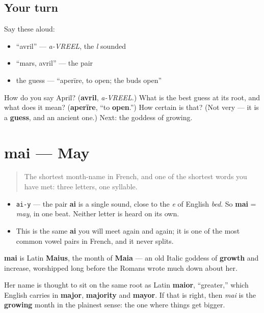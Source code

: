 \subsection*{Your turn}
Say these aloud:

\begin{itemize}
\raggedright
  \item \textquotedblleft{}avril\textquotedblright{} — \emph{a-VREEL}, the \emph{l} sounded
  \item \textquotedblleft{}mars, avril\textquotedblright{} — the pair
  \item the guess — \textquotedblleft{}aperīre, to open; the buds open\textquotedblright{}
\end{itemize}

\begin{tcolorbox}[breakable,colback=teal!4,colframe=teal!35!black,title={Before you move on}]
How do you say April? (\textbf{avril}, \emph{a-VREEL}.) What is the best guess at its root, and what does it mean? (\textbf{aperīre}, \textquotedblleft{}to \textbf{open}.\textquotedblright{}) How certain is that? (Not very — it is a \textbf{guess}, and an ancient one.) Next: the goddess of growing.
\end{tcolorbox}
\section[mai]{mai — May}

\label{lesson:FR-C09-mai}



\begin{quote}
The shortest month-name in French, and one of the shortest words you have met: three letters, one syllable.
\end{quote}

\begin{sounds}
\begin{itemize}
\raggedright
  \item \texttt{ai-y} — the pair \textbf{ai} is a single sound, close to the \emph{e} of English \emph{bed}. So \textbf{mai} = \emph{may}, in one beat. Neither letter is heard on its own.
  \item This is the same \textbf{ai} you will meet again and again; it is one of the most common vowel pairs in French, and it never splits.
\end{itemize}
\end{sounds}

\begin{cousinweb}
\textbf{mai} is Latin \textbf{Maius}, the month of \textbf{Maia} — an old Italic goddess of \textbf{growth} and increase, worshipped long before the Romans wrote much down about her.

Her name is thought to sit on the same root as Latin \textbf{maior}, \textquotedblleft{}greater,\textquotedblright{} which English carries in \textbf{major}, \textbf{majority} and \textbf{mayor}. If that is right, then \emph{mai} is the \textbf{growing} month in the plainest sense: the one where things get bigger.
\end{cousinweb}


